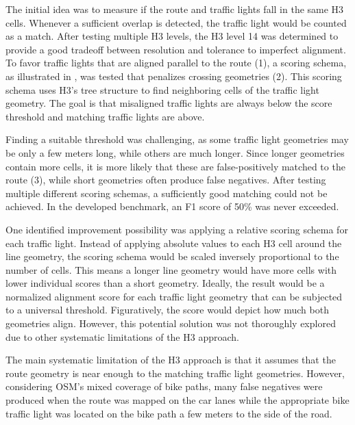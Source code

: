 The initial idea was to measure if the route and traffic lights fall in the same H3 cells. Whenever a sufficient overlap is detected, the traffic light would be counted as a match. After testing multiple H3 levels, the H3 level 14 was determined to provide a good tradeoff between resolution and tolerance to imperfect alignment. To favor traffic lights that are aligned parallel to the route (1), a scoring schema, as illustrated in , was tested that penalizes crossing geometries (2). This scoring schema uses H3's tree structure to find neighboring cells of the traffic light geometry. The goal is that misaligned traffic lights are always below the score threshold and matching traffic lights are above.

Finding a suitable threshold was challenging, as some traffic light geometries may be only a few meters long, while others are much longer. Since longer geometries contain more cells, it is more likely that these are false-positively matched to the route (3), while short geometries often produce false negatives. After testing multiple different scoring schemas, a sufficiently good matching could not be achieved. In the developed benchmark, an F1 score of 50\% was never exceeded. 

One identified improvement possibility was applying a relative scoring schema for each traffic light. Instead of applying absolute values to each H3 cell around the line geometry, the scoring schema would be scaled inversely proportional to the number of cells. This means a longer line geometry would have more cells with lower individual scores than a short geometry. Ideally, the result would be a normalized alignment score for each traffic light geometry that can be subjected to a universal threshold. Figuratively, the score would depict how much both geometries align. However, this potential solution was not thoroughly explored due to other systematic limitations of the H3 approach.

The main systematic limitation of the H3 approach is that it assumes that the route geometry is near enough to the matching traffic light geometries. However, considering OSM's mixed coverage of bike paths, many false negatives were produced when the route was mapped on the car lanes while the appropriate bike traffic light was located on the bike path a few meters to the side of the road.

